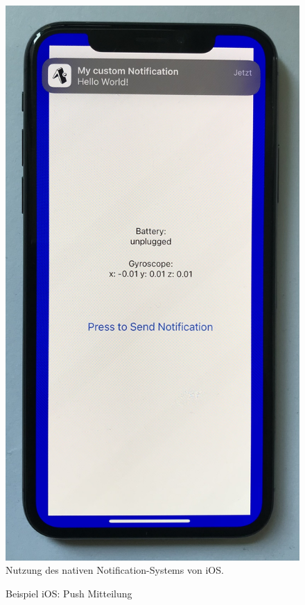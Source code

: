 \documentclass[a4paper]{scrartcl}
\begin{document}
\begin{figure}[H]
	\centering
	\caption{Beispiel iOS: Push Mitteilung}
	\includegraphics[scale=0.08]{_assets/iOS_push_notification.jpg} \\
	Nutzung des nativen Notification-Systems von iOS. 
\end{figure}
\end{document}
